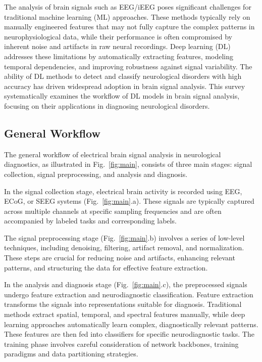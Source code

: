 The analysis of brain signals such as EEG/iEEG poses significant challenges for traditional machine learning (ML) approaches. These methods typically rely on manually engineered features that may not fully capture the complex patterns in neurophysiological data, while their performance is often compromised by inherent noise and artifacts in raw neural recordings. Deep learning (DL) addresses these limitations by automatically extracting features, modeling temporal dependencies, and improving robustness against signal variability. The ability of DL methods to detect and classify neurological disorders with high accuracy has driven widespread adoption in brain signal analysis. This survey systematically examines the workflow of DL models in brain signal analysis, focusing on their applications in diagnosing neurological disorders.


\subsection{General Workflow}

The general workflow of electrical brain signal analysis in neurological diagnostics, as illustrated in Fig.~\ref{fig:main}, consists of three main stages: signal collection, signal preprocessing, and analysis and diagnosis.

In the signal collection stage, electrical brain activity is recorded using EEG, ECoG, or SEEG systems (Fig.~\ref{fig:main}.a). These signals are typically captured across multiple channels at specific sampling frequencies and are often accompanied by labeled tasks and corresponding labels.

The signal preprocessing stage (Fig.~\ref{fig:main}.b) involves a series of low-level techniques, including denoising, filtering, artifact removal, and normalization. These steps are crucial for reducing noise and artifacts, enhancing relevant patterns, and structuring the data for effective feature extraction.

In the analysis and diagnosis stage (Fig.~\ref{fig:main}.c), the preprocessed signals undergo feature extraction and neurodiagnostic classification. Feature extraction transforms the signals into representations suitable for diagnosis. Traditional methods extract spatial, temporal, and spectral features manually, while deep learning approaches automatically learn complex, diagnostically relevant patterns. These features are then fed into classifiers for specific neurodiagnostic tasks. The training phase involves careful consideration of network backbones, training paradigms and data partitioning strategies.


